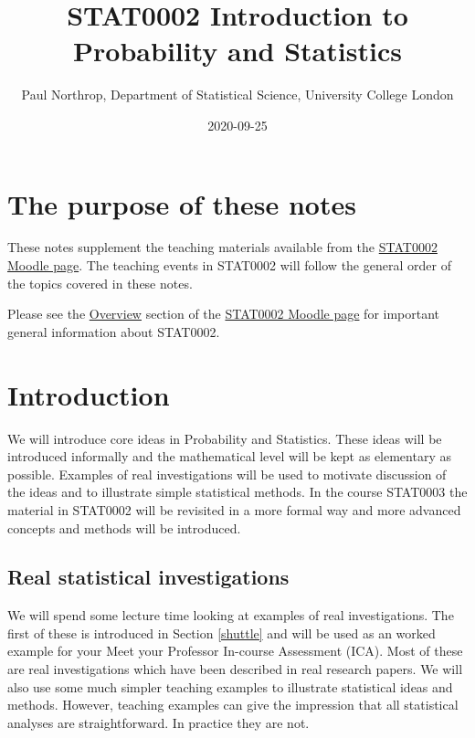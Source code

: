 \documentclass[
  british,
]{book}
\title{STAT0002 Introduction to Probability and Statistics}
\author{Paul Northrop, Department of Statistical Science, University College London}
\date{2020-09-25}
\begin{document}
\maketitle

{
\setcounter{tocdepth}{1}
\tableofcontents
}
\hypertarget{the-purpose-of-these-notes}{%
\chapter*{The purpose of these notes}\label{the-purpose-of-these-notes}}

These notes supplement the teaching materials available from the \href{https://moodle.ucl.ac.uk/course/view.php?id=8579}{STAT0002 Moodle page}. The teaching events in STAT0002 will follow the general order of the topics covered in these notes.

Please see the \href{https://moodle.ucl.ac.uk/course/view.php?id=8579\&section=1}{Overview} section of the \href{https://moodle.ucl.ac.uk/course/view.php?id=8579}{STAT0002 Moodle page} for important general information about STAT0002.

\hypertarget{introduction}{%
\chapter{Introduction}\label{introduction}}

We will introduce core ideas in Probability and Statistics. These ideas will be introduced informally and the mathematical level will be kept as elementary as possible. Examples of real investigations will be used to motivate discussion of the ideas and to illustrate simple statistical methods. In the course STAT0003 the material in STAT0002 will be revisited in a more formal way and more advanced concepts and methods will be introduced.

\hypertarget{real}{%
\section{Real statistical investigations}\label{real}}

We will spend some lecture time looking at examples of real investigations. The first of these is introduced in Section \ref{shuttle} and will be used as an worked example for your Meet your Professor In-course Assessment (ICA). Most of these are real investigations which have been described in real research papers. We will also use some much simpler teaching examples to illustrate statistical ideas and methods. However, teaching examples can give the impression that all statistical analyses are straightforward.
In practice they are not.
\end{document}
